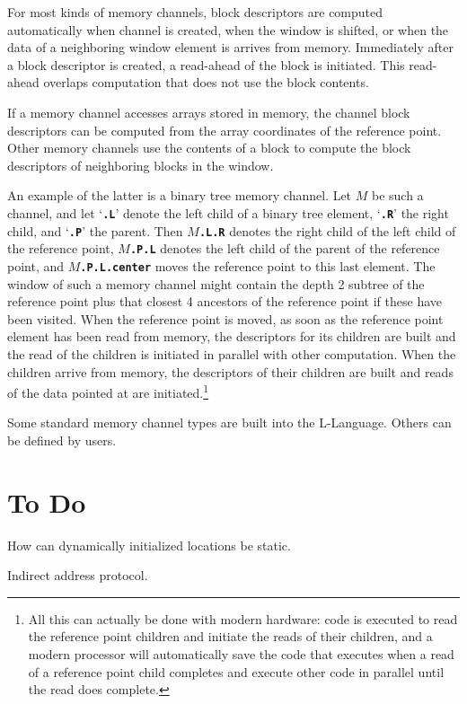 \documentclass[12pt]{article}
\newcommand{\TT}[1]{{\tt \bfseries #1}}
\begin{document}
For most kinds of memory channels, block descriptors are computed
automatically when channel is created, when the window is
shifted, or when the data of
a neighboring window element is arrives from memory.
Immediately after a block descriptor is created, a read-ahead of
the block is initiated.  This read-ahead overlaps computation that
does not use the block contents.

If a memory channel accesses arrays stored in memory,
the channel block descriptors can be computed from the array coordinates
of the reference point.  Other memory channels use the contents
of a block to compute the block descriptors of neighboring blocks
in the window.

An example of the latter is a binary tree memory channel.
Let $M$ be such a channel, and let `\TT{.L}' denote the left
child of a binary tree element, `\TT{.R}' the right child, and
`\TT{.P}' the parent.  Then $M\!$\TT{.L.R} denotes the right
child of the left child of the reference point, $M\!$\TT{.P.L}
denotes the left child of the parent of the reference point,
and $M\!$\TT{.P.L.center} moves the reference point to this last element.
The window of such a memory channel might contain the depth 2
subtree of the reference point plus that closest 4 ancestors of the
reference point if these have been visited.  When the reference
point is moved, as soon as the reference point element has been
read from memory, the descriptors for its children are built and
the read of the children is initiated in parallel with other
computation.  When the children arrive from memory, the descriptors
of their children are built and reads of the data pointed at
are initiated.\footnote{All this can actually be done with modern
hardware: code is executed to read the reference point children and initiate the
reads of their children, and a modern processor will automatically
save the code that
executes when a read of a reference point child completes and execute
other code in parallel until the read does complete.}

Some standard memory channel types are built into the L-Language.
Others can be defined by users.

\section{To Do}

How can dynamically initialized locations be static.

Indirect address protocol.
\label{INDIRECT-ADDRESS-PROTOCOL}
\end{document}
